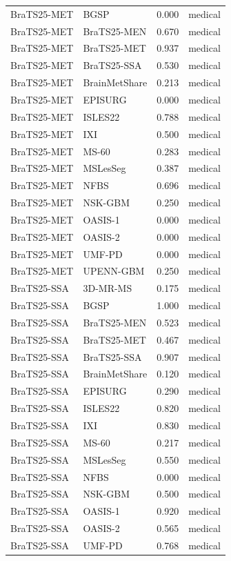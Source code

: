 \begin{tabular}{llrl}
BraTS25-MET & BGSP & 0.000 & medical \\
BraTS25-MET & BraTS25-MEN & 0.670 & medical \\
BraTS25-MET & BraTS25-MET & 0.937 & medical \\
BraTS25-MET & BraTS25-SSA & 0.530 & medical \\
BraTS25-MET & BrainMetShare & 0.213 & medical \\
BraTS25-MET & EPISURG & 0.000 & medical \\
BraTS25-MET & ISLES22 & 0.788 & medical \\
BraTS25-MET & IXI & 0.500 & medical \\
BraTS25-MET & MS-60 & 0.283 & medical \\
BraTS25-MET & MSLesSeg & 0.387 & medical \\
BraTS25-MET & NFBS & 0.696 & medical \\
BraTS25-MET & NSK-GBM & 0.250 & medical \\
BraTS25-MET & OASIS-1 & 0.000 & medical \\
BraTS25-MET & OASIS-2 & 0.000 & medical \\
BraTS25-MET & UMF-PD & 0.000 & medical \\
BraTS25-MET & UPENN-GBM & 0.250 & medical \\
BraTS25-SSA & 3D-MR-MS & 0.175 & medical \\
BraTS25-SSA & BGSP & 1.000 & medical \\
BraTS25-SSA & BraTS25-MEN & 0.523 & medical \\
BraTS25-SSA & BraTS25-MET & 0.467 & medical \\
BraTS25-SSA & BraTS25-SSA & 0.907 & medical \\
BraTS25-SSA & BrainMetShare & 0.120 & medical \\
BraTS25-SSA & EPISURG & 0.290 & medical \\
BraTS25-SSA & ISLES22 & 0.820 & medical \\
BraTS25-SSA & IXI & 0.830 & medical \\
BraTS25-SSA & MS-60 & 0.217 & medical \\
BraTS25-SSA & MSLesSeg & 0.550 & medical \\
BraTS25-SSA & NFBS & 0.000 & medical \\
BraTS25-SSA & NSK-GBM & 0.500 & medical \\
BraTS25-SSA & OASIS-1 & 0.920 & medical \\
BraTS25-SSA & OASIS-2 & 0.565 & medical \\
BraTS25-SSA & UMF-PD & 0.768 & medical \\

\end{tabular}

